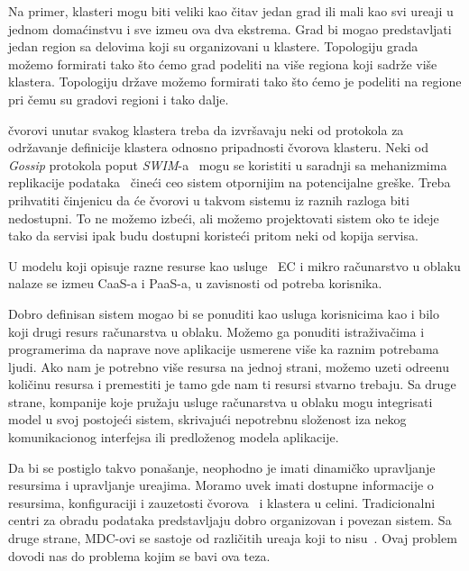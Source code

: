 Na primer, klasteri mogu biti veliki kao \v citav jedan grad ili mali kao svi ure\dj aji u jednom doma\'cinstvu i sve izme\dj u ova dva ekstrema. Grad bi mogao predstavljati jedan region sa delovima koji su organizovani u klastere. Topologiju grada mo\v zemo formirati tako \v sto \'cemo grad podeliti na vi\v se regiona koji sadr\v ze vi\v se klastera. Topologiju dr\v zave mo\v zemo formirati tako \v sto \'cemo je podeliti na regione pri \v cemu su gradovi regioni i tako dalje. 

\v cvorovi unutar svakog klastera treba da izvr\v savaju neki od protokola za odr\v zavanje definicije klastera odnosno pripadnosti \v cvorova klasteru. Neki od \textit{Gossip} protokola poput \textit{SWIM}-a~\cite{DasGM02} mogu se koristiti u saradnji sa mehanizmima replikacije podataka~\cite {LiBCL20, CauCBFCEB16, CRDTS_Nuno} \v cine\'ci ceo sistem otpornijim na potencijalne gre\v ske. Treba prihvatiti \v cinjenicu da \'ce \v cvorovi u takvom sistemu iz raznih razloga biti nedostupni. To ne mo\v zemo izbe\'ci, ali mo\v zemo projektovati sistem oko te ideje tako da servisi ipak budu dostupni koriste\'ci pritom neki od kopija servisa.

U modelu koji opisuje razne resurse kao usluge~\cite{DuanFZSNH15} EC i mikro ra\v cunarstvo u oblaku nalaze se izme\dj u CaaS-a i PaaS-a, u zavisnosti od potreba korisnika.

Dobro definisan sistem mogao bi se ponuditi kao usluga korisnicima kao i bilo koji drugi resurs ra\v cunarstva u oblaku. Mo\v zemo ga ponuditi istra\v ziva\v cima i programerima da naprave nove aplikacije usmerene vi\v se ka raznim potrebama ljudi. Ako nam je potrebno vi\v se resursa na jednoj strani, mo\v zemo uzeti odre\dj enu koli\v cinu resursa i premestiti je tamo gde nam ti resursi stvarno trebaju. Sa druge strane, kompanije koje pru\v zaju usluge ra\v cunarstva u oblaku mogu integrisati model u svoj postoje\'ci sistem, skrivaju\'ci nepotrebnu slo\v zenost iza nekog komunikacionog interfejsa ili predlo\v zenog modela aplikacije.

Da bi se postiglo takvo pona\v sanje, neophodno je imati dinami\v cko upravljanje resursima i upravljanje ure\dj ajima. Moramo uvek imati dostupne informacije o resursima, konfiguraciji i zauzetosti \v cvorova~\cite{GubbiBMP13, WangZZWYW17} i klastera u celini. Tradicionalni centri za obradu podataka predstavljaju dobro organizovan i povezan sistem. Sa druge strane, MDC-ovi se sastoje od razli\v citih ure\dj aja koji to nisu~\cite{JiangCGZW19}. Ovaj problem dovodi nas do problema kojim se bavi ova teza.


